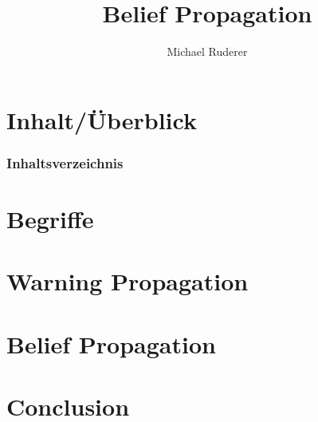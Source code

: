 \documentclass{beamer}
\title{Belief Propagation}
\author{Michael Ruderer}
\institute{Uni Ulm\\}
\begin{document}
\hspace*{-1.49cm}
\frame[plain]{\titlepage}

\hspace*{-0.7cm}
\section*{Inhalt/Überblick} %
\begin{frame}
  \frametitle{Inhaltsverzeichnis}
  \tableofcontents
\end{frame}


\section{Begriffe}



\section{Warning Propagation}


\section{Belief Propagation}

\section{Conclusion}
\end{document}

